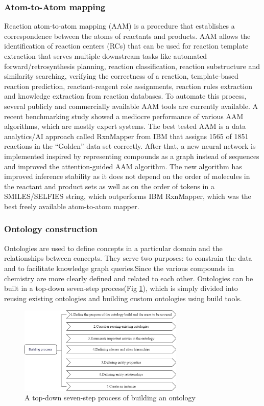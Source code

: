 \documentclass[%
 aip,
 jmp,%
 amsmath,amssymb,
 reprint,%
]{revtex4-2}
\begin{document}
\subsubsection{Atom-to-Atom mapping}
Reaction atom-to-atom mapping (AAM) is a procedure that establishes a correspondence between the atoms of 
reactants and products. AAM allows the identification of reaction centers (RCs) that can be used for reaction template 
extraction that serves multiple downstream tasks like automated forward/retrosynthesis planning, 
reaction classification, reaction substructure and similarity searching, verifying the correctness of a reaction, template-based reaction prediction, 
reactant-reagent role assignments, reaction rules extraction and knowledge extraction from reaction databases. 
To automate this process, several publicly and commercially available AAM tools are currently available. 
A recent benchmarking study showed a mediocre performance of 
various AAM algorithms, which are mostly expert systems. The best tested AAM is a data analytics/AI 
approach called RxnMapper\cite{schwaller2020unsupervised} from IBM that assigns 1565 of 1851 reactions in the “Golden” data set correctly.
After that, a new neural network is implemented inspired by representing compounds as a graph 
instead of sequences and improved the attention-guided AAM algorithm\cite{nugmanov2022bidirectional}. The new algorithm has improved 
inference stability as it does not depend on the order of molecules in the reactant and product 
sets as well as on the order of tokens in a SMILES/SELFIES string, which outperforms IBM RxnMapper, 
which was the best freely available atom-to-atom mapper.

\subsubsection{Ontology construction}
Ontologies are used to define concepts in a particular domain and the relationships between concepts. They serve two purposes: to constrain 
the data and to facilitate knowledge graph queries.Since the various compounds in chemistry are more clearly defined and related to each other.
Ontologies can be built in a top-down seven-step process(Fig \ref{ Fig.4 }), which is simply divided 
into reusing existing ontologies and building custom ontologies using build tools.
\begin{figure}[htbp]
 \centering
 \includegraphics[width=0.7\textwidth]{figure/4.png}
 \caption{ A top-down seven-step process of building an ontology }
 \label{ Fig.4 }
\end{figure}
\end{document}
